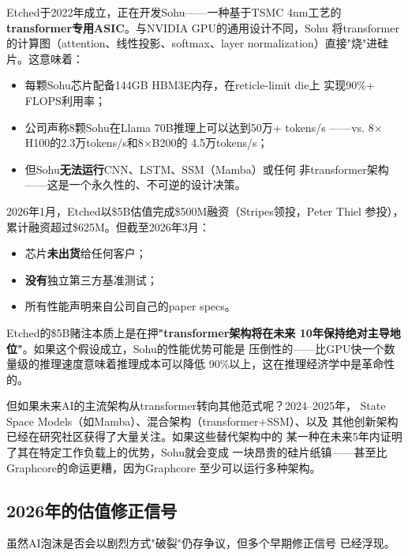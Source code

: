 Etched于2022年成立，正在开发Sohu——一种基于TSMC 4nm工艺的
\textbf{transformer专用ASIC}。与NVIDIA GPU的通用设计不同，Sohu
将transformer的计算图（attention、线性投影、softmax、layer
normalization）直接"烧"进硅片。这意味着：
\begin{itemize}
  \item 每颗Sohu芯片配备144GB HBM3E内存，在reticle-limit die上
    实现90\%+ FLOPS利用率；
  \item 公司声称8颗Sohu在Llama 70B推理上可以达到50万+ tokens/s
    ——vs. 8$\times$H100的2.3万tokens/s和8$\times$B200的
    4.5万tokens/s；
  \item 但Sohu\textbf{无法运行}CNN、LSTM、SSM（Mamba）或任何
    非transformer架构——这是一个永久性的、不可逆的设计决策。
\end{itemize}

2026年1月，Etched以\$5B估值完成\$500M融资（Stripes领投，Peter Thiel
参投），累计融资超过\$625M。但截至2026年3月：
\begin{itemize}
  \item 芯片\textbf{未出货}给任何客户；
  \item \textbf{没有}独立第三方基准测试；
  \item 所有性能声明来自公司自己的paper specs。
\end{itemize}

Etched的\$5B赌注本质上是在押\textbf{"transformer架构将在未来
10年保持绝对主导地位"}。如果这个假设成立，Sohu的性能优势可能是
压倒性的——比GPU快一个数量级的推理速度意味着推理成本可以降低
90\%以上，这在推理经济学中是革命性的。

但如果未来AI的主流架构从transformer转向其他范式呢？2024--2025年，
State Space Models（如Mamba）、混合架构（transformer+SSM）、以及
其他创新架构已经在研究社区获得了大量关注。如果这些替代架构中的
某一种在未来5年内证明了其在特定工作负载上的优势，Sohu就会变成
一块昂贵的硅片纸镇——甚至比Graphcore的命运更糟，因为Graphcore
至少可以运行多种架构。

\subsection{2026年的估值修正信号}
\label{subsec:fund-correction-signals}

虽然AI泡沫是否会以剧烈方式"破裂"仍存争议，但多个早期修正信号
已经浮现。

